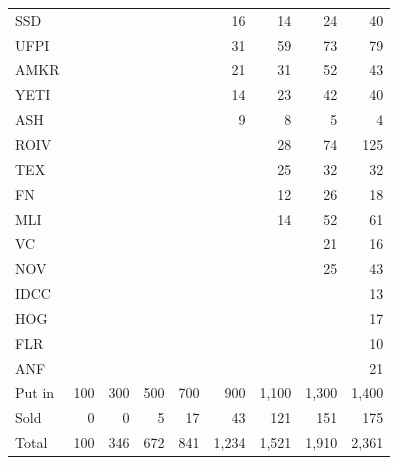 \documentclass[11pt,a4paper]{article}
\begin{document}
{\begin{longtable}{l r r r r r r r r }
SSD &  &  &  &  & 16 & 14 & 24 & 40 \\
UFPI &  &  &  &  & 31 & 59 & 73 & 79 \\
AMKR &  &  &  &  & 21 & 31 & 52 & 43 \\
YETI &  &  &  &  & 14 & 23 & 42 & 40 \\
ASH &  &  &  &  & 9 & 8 & 5 & 4 \\
ROIV &  &  &  &  &  & 28 & 74 & 125 \\
TEX &  &  &  &  &  & 25 & 32 & 32 \\
FN &  &  &  &  &  & 12 & 26 & 18 \\
MLI &  &  &  &  &  & 14 & 52 & 61 \\
VC &  &  &  &  &  &  & 21 & 16 \\
NOV &  &  &  &  &  &  & 25 & 43 \\
IDCC &  &  &  &  &  &  &  & 13 \\
HOG &  &  &  &  &  &  &  & 17 \\
FLR &  &  &  &  &  &  &  & 10 \\
ANF &  &  &  &  &  &  &  & 21 \\
\hline
Put in & 100 & 300 & 500 & 700 & 900 & 1,100 & 1,300 & 1,400 \\
Sold & 0 & 0 & 5 & 17 & 43 & 121 & 151 & 175 \\
Total & 100 & 346 & 672 & 841 & 1,234 & 1,521 & 1,910 & 2,361 \\
\hline
\end{longtable}}
\end{document}
